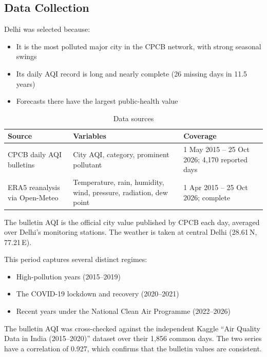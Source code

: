 \subsection{Data Collection}

Delhi was selected because:
\begin{itemize}
\item It is the most polluted major city in the CPCB network, with strong seasonal swings
\item Its daily AQI record is long and nearly complete (26 missing days in 11.5 years)
\item Forecasts there have the largest public-health value
\end{itemize}

\begin{table}[H]
\centering
\caption{Data sources}
\begin{tabular}{|p{5.2cm}|p{5.6cm}|p{4.6cm}|}
\hline
\textbf{Source} & \textbf{Variables} & \textbf{Coverage} \\ \hline
CPCB daily AQI bulletins \cite{cpcb2014,urbanemissions} & City AQI, category, prominent pollutant & 1 May 2015 -- 25 Oct 2026; 4,170 reported days \\ \hline
ERA5 reanalysis via Open-Meteo \cite{hersbach2020,openmeteo} & Temperature, rain, humidity, wind, pressure, radiation, dew point & 1 Apr 2015 -- 25 Oct 2026; complete \\ \hline
\end{tabular}
\end{table}
The bulletin AQI is the official city value published by CPCB each day, averaged over Delhi's monitoring stations. The weather is taken at central Delhi (28.61\,N, 77.21\,E).

This period captures several distinct regimes:
\begin{itemize}
\item High-pollution years (2015--2019)
\item The COVID-19 lockdown and recovery (2020--2021)
\item Recent years under the National Clean Air Programme (2022--2026)
\end{itemize}

The bulletin AQI was cross-checked against the independent Kaggle ``Air Quality Data in India (2015--2020)'' dataset over their 1,856 common days. The two series have a correlation of 0.927, which confirms that the bulletin values are consistent.

